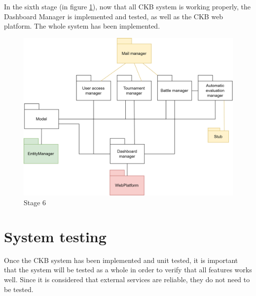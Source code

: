 In the sixth stage (in figure \ref{fig:stage6}), now that all CKB system is working properly, the Dashboard Manager is implemented and tested, as well as the CKB web platform. The whole system has been implemented.
\begin{figure}[h]
    \centering
    \includegraphics[scale=0.7]{images/testing/stage6.png}
    \caption{Stage 6}
    \label{fig:stage6}
\end{figure}

\section{System testing}\label{sec:systemtesting}
Once the CKB system has been implemented and unit tested, it is important that the system will be tested as a whole in order to verify that all features works well. \newline
Since it is considered that external services are reliable, they do not need to be tested. \newline

